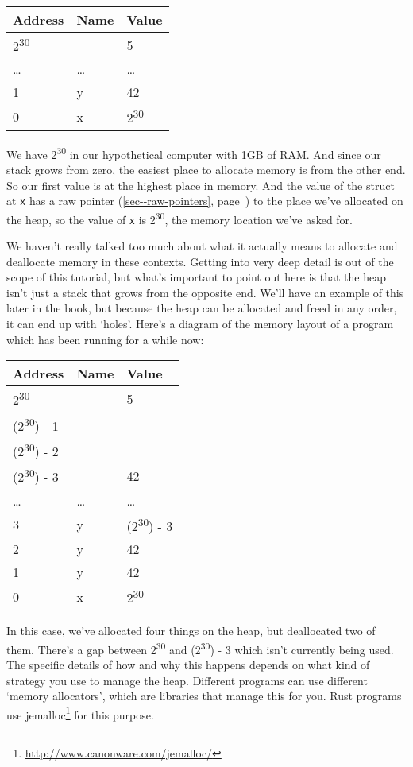 \documentclass[a4paper,]{book}
\renewcommand*{\hyperref}[2][\ar]{%
  \def\ar{#2}%
  #2 (\autoref{#1}, page~\pageref{#1})}
\renewcommand{\href}[2]{#2\footnote{\url{#1}}}
\begin{document}
\begin{longtable}[c]{@{}lll@{}}
\toprule
Address & Name & Value\tabularnewline
\midrule
\endhead
2\textsuperscript{30} & & 5\tabularnewline
\ldots{} & \ldots{} & \ldots{}\tabularnewline
1 & y & 42\tabularnewline
0 & x & 2\textsuperscript{30}\tabularnewline
\bottomrule
\end{longtable}

We have 2\textsuperscript{30} in our hypothetical computer with 1GB of
RAM. And since our stack grows from zero, the easiest place to allocate
memory is from the other end. So our first value is at the highest place
in memory. And the value of the struct at \texttt{x} has a
\hyperref[sec--raw-pointers]{raw pointer} to the place we've allocated
on the heap, so the value of \texttt{x} is 2\textsuperscript{30}, the
memory location we've asked for.

We haven't really talked too much about what it actually means to
allocate and deallocate memory in these contexts. Getting into very deep
detail is out of the scope of this tutorial, but what's important to
point out here is that the heap isn't just a stack that grows from the
opposite end. We'll have an example of this later in the book, but
because the heap can be allocated and freed in any order, it can end up
with `holes'. Here's a diagram of the memory layout of a program which
has been running for a while now:

\begin{longtable}[c]{@{}lll@{}}
\toprule
Address & Name & Value\tabularnewline
\midrule
\endhead
2\textsuperscript{30} & & 5\tabularnewline
(2\textsuperscript{30}) - 1 & &\tabularnewline
(2\textsuperscript{30}) - 2 & &\tabularnewline
(2\textsuperscript{30}) - 3 & & 42\tabularnewline
\ldots{} & \ldots{} & \ldots{}\tabularnewline
3 & y & (2\textsuperscript{30}) - 3\tabularnewline
2 & y & 42\tabularnewline
1 & y & 42\tabularnewline
0 & x & 2\textsuperscript{30}\tabularnewline
\bottomrule
\end{longtable}

In this case, we've allocated four things on the heap, but deallocated
two of them. There's a gap between 2\textsuperscript{30} and
(2\textsuperscript{30}) - 3 which isn't currently being used. The
specific details of how and why this happens depends on what kind of
strategy you use to manage the heap. Different programs can use
different `memory allocators', which are libraries that manage this for
you. Rust programs use
\href{http://www.canonware.com/jemalloc/}{jemalloc} for this purpose.
\end{document}
